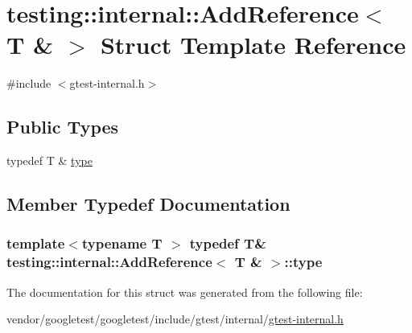 \hypertarget{structtesting_1_1internal_1_1AddReference_3_01T_01_6_01_4}{}\section{testing\+:\+:internal\+:\+:Add\+Reference$<$ T \& $>$ Struct Template Reference}
\label{structtesting_1_1internal_1_1AddReference_3_01T_01_6_01_4}


{\ttfamily \#include $<$gtest-\/internal.\+h$>$}

\subsection*{Public Types}
\begin{DoxyCompactItemize}
\item 
typedef T \& \hyperlink{structtesting_1_1internal_1_1AddReference_3_01T_01_6_01_4_a93c064cdcdaced0abd167258425e57af}{type}
\end{DoxyCompactItemize}


\subsection{Member Typedef Documentation}
\subsubsection[{\texorpdfstring{type}{type}}]{\setlength{\rightskip}{0pt plus 5cm}template$<$typename T $>$ typedef T\& {\bf testing\+::internal\+::\+Add\+Reference}$<$ T \& $>$\+::{\bf type}}\hypertarget{structtesting_1_1internal_1_1AddReference_3_01T_01_6_01_4_a93c064cdcdaced0abd167258425e57af}{}\label{structtesting_1_1internal_1_1AddReference_3_01T_01_6_01_4_a93c064cdcdaced0abd167258425e57af}


The documentation for this struct was generated from the following file\+:\begin{DoxyCompactItemize}
\item 
vendor/googletest/googletest/include/gtest/internal/\hyperlink{gtest-internal_8h}{gtest-\/internal.\+h}\end{DoxyCompactItemize}
